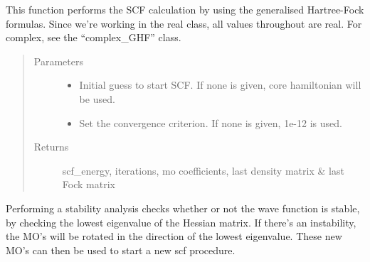 \documentclass[letterpaper,10pt,english]{sphinxmanual}
\begin{document}
\begin{fulllineitems}
\begin{fulllineitems}
\begin{quote}
\begin{description}
\end{description}\end{quote}

\end{fulllineitems}


\begin{fulllineitems}
\label{\detokenize{Real_GHF:ghf.real_GHF.RealGHF.scf}}
This function performs the SCF calculation by using the generalised Hartree-Fock formulas. Since we’re working
in the real class, all values throughout are real. For complex, see the “complex\_GHF” class.
\begin{quote}\begin{description}
\item[{Parameters}] \leavevmode\begin{itemize}
\item {} 
 \textendash{} Initial guess to start SCF. If none is given, core hamiltonian will be used.

\item {} 
 \textendash{} Set the convergence criterion. If none is given, 1e-12 is used.

\end{itemize}

\item[{Returns}] \leavevmode
scf\_energy, iterations, mo coefficients, last density matrix \& last Fock matrix

\end{description}\end{quote}

\end{fulllineitems}


\begin{fulllineitems}
\label{\detokenize{Real_GHF:ghf.real_GHF.RealGHF.stability}}
Performing a stability analysis checks whether or not the wave function is stable, by checking the lowest
eigenvalue of the Hessian matrix. If there’s an instability, the MO’s will be rotated in the direction
of the lowest eigenvalue. These new MO’s can then be used to start a new scf procedure.


\end{fulllineitems}
\end{fulllineitems}
\end{document}
